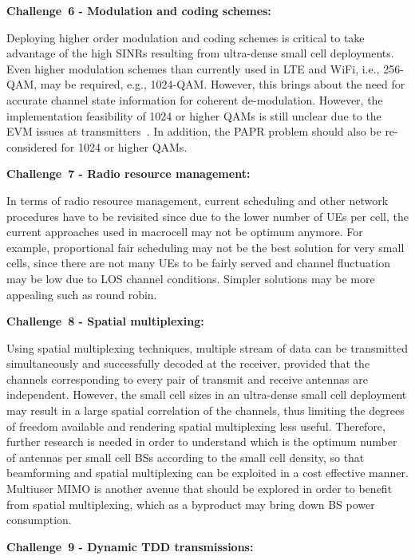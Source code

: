 \documentclass{IEEEtran}
\begin{document}
{\bf Challenge~6 - Modulation and coding schemes:}

Deploying higher order modulation and coding schemes
is critical to take advantage of the high \acp{SINR} resulting from ultra-dense small cell deployments.
Even higher modulation schemes than currently used in \ac{LTE} and \ac{WiFi}, i.e., 256-QAM, may be required, e.g., 1024-QAM.
However, this brings about the need for accurate channel state information for coherent de-modulation.
However, the implementation feasibility of 1024 or higher QAMs is still unclear due to the \ac{EVM} issues at transmitters~\cite{EVM}.
In addition, the \ac{PAPR} problem should also be re-considered for 1024 or higher QAMs.


{\bf Challenge~7 - Radio resource management:}

In terms of radio resource management,
current scheduling and other network procedures have to be revisited
since due to the lower number of \acp{UE} per cell,
the current approaches used in macrocell may not be optimum anymore.
For example, proportional fair scheduling  may not be the best solution for very small cells,
since there are not many \acp{UE} to be fairly served and channel fluctuation may be low due to \ac{LOS} channel conditions.
Simpler solutions may be more appealing such as round robin.


{\bf Challenge~8 - Spatial multiplexing:}

Using spatial multiplexing techniques, multiple stream of data can be transmitted simultaneously and successfully decoded at the receiver,
provided that the channels corresponding to every pair of transmit and receive antennas are independent. 
However, the small cell sizes in an ultra-dense small cell deployment may result in a large spatial correlation of the channels,
thus limiting the degrees of freedom available and rendering spatial multiplexing less useful.
Therefore, further research is needed in order to understand
which is the optimum number of antennas per small cell \acp{BS} according to the small cell density,
so that beamforming and spatial multiplexing can be exploited in a cost effective manner.
Multiuser \ac{MIMO} is another avenue that should be explored in order to benefit from spatial multiplexing,
which as a byproduct may bring down BS power consumption.


{\bf Challenge~9 - Dynamic TDD transmissions:}
\end{document}
